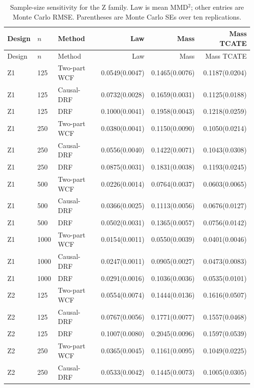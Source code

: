 \begingroup
\tiny
\setlength{\tabcolsep}{1.5pt}
\begin{longtable}{lllrrr}
\caption{Sample-size sensitivity for the Z family. Law is mean MMD$^2$; other entries are Monte Carlo RMSE. Parentheses are Monte Carlo SEs over ten replications.}\label{tab:sample-size-z}\\
\toprule
Design & $n$ & Method & Law & Mass & Mass TCATE \\
\midrule
\endfirsthead
\toprule
Design & $n$ & Method & Law & Mass & Mass TCATE \\
\midrule
\endhead
Z1 & 125 & Two-part WCF & 0.0549(0.0047) & 0.1465(0.0076) & 0.1187(0.0204) \\
Z1 & 125 & Causal-DRF & 0.0732(0.0028) & 0.1659(0.0031) & 0.1125(0.0188) \\
Z1 & 125 & DRF & 0.1000(0.0041) & 0.1958(0.0043) & 0.1218(0.0259) \\
\addlinespace
Z1 & 250 & Two-part WCF & 0.0380(0.0041) & 0.1150(0.0090) & 0.1050(0.0214) \\
Z1 & 250 & Causal-DRF & 0.0556(0.0040) & 0.1422(0.0071) & 0.1043(0.0308) \\
Z1 & 250 & DRF & 0.0875(0.0031) & 0.1831(0.0038) & 0.1193(0.0245) \\
\addlinespace
Z1 & 500 & Two-part WCF & 0.0226(0.0014) & 0.0764(0.0037) & 0.0603(0.0065) \\
Z1 & 500 & Causal-DRF & 0.0366(0.0025) & 0.1113(0.0056) & 0.0676(0.0127) \\
Z1 & 500 & DRF & 0.0502(0.0031) & 0.1365(0.0057) & 0.0756(0.0142) \\
\addlinespace
Z1 & 1000 & Two-part WCF & 0.0154(0.0011) & 0.0550(0.0039) & 0.0401(0.0046) \\
Z1 & 1000 & Causal-DRF & 0.0247(0.0011) & 0.0905(0.0027) & 0.0473(0.0083) \\
Z1 & 1000 & DRF & 0.0291(0.0016) & 0.1036(0.0036) & 0.0535(0.0101) \\
\addlinespace
\midrule
Z2 & 125 & Two-part WCF & 0.0554(0.0074) & 0.1444(0.0136) & 0.1616(0.0507) \\
Z2 & 125 & Causal-DRF & 0.0767(0.0056) & 0.1771(0.0077) & 0.1557(0.0468) \\
Z2 & 125 & DRF & 0.1007(0.0080) & 0.2045(0.0096) & 0.1597(0.0539) \\
\addlinespace
Z2 & 250 & Two-part WCF & 0.0365(0.0045) & 0.1161(0.0095) & 0.1049(0.0225) \\
Z2 & 250 & Causal-DRF & 0.0533(0.0042) & 0.1445(0.0073) & 0.1005(0.0305) \\

\end{longtable}
